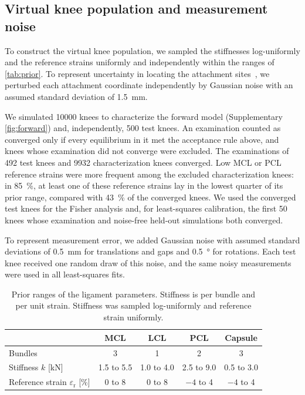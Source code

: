 \subsection{Virtual knee population and measurement noise}\label{sec:population}

To construct the virtual knee population, we sampled the stiffnesses log-uniformly and the reference strains uniformly and independently within the ranges of \autoref{tab:prior}.
To represent uncertainty in locating the attachment sites~\autocite{rachmat2014generating}, we perturbed each attachment coordinate independently by Gaussian noise with an assumed standard deviation of \SI{1.5}{\milli\meter}.

We simulated \num{10000} knees to characterize the forward model (Supplementary \autoref{fig:forward}) and, independently, 500 test knees.
An examination counted as converged only if every equilibrium in it met the acceptance rule above, and knees whose examination did not converge were excluded.
The examinations of 492 test knees and \num{9932} characterization knees converged.
Low MCL or PCL reference strains were more frequent among the excluded characterization knees: in \SI{85}{\percent}, at least one of these reference strains lay in the lowest quarter of its prior range, compared with \SI{43}{\percent} of the converged knees.
We used the converged test knees for the Fisher analysis and, for least-squares calibration, the first 50 knees whose examination and noise-free held-out simulations both converged.

To represent measurement error, we added Gaussian noise with assumed standard deviations of \SI{0.5}{\milli\meter} for translations and gaps and \SI{0.5}{\degree} for rotations.
Each test knee received one random draw of this noise, and the same noisy measurements were used in all least-squares fits.

\begin{table}[H]
\centering
\caption{Prior ranges of the ligament parameters.
Stiffness is per bundle and per unit strain.
Stiffness was sampled log-uniformly and reference strain uniformly.}
\label{tab:prior}
\begin{tabular}{lcccc}
\toprule
 & MCL & LCL & PCL & Capsule \\
\midrule
Bundles & 3 & 1 & 2 & 3\\
Stiffness $k$ [\si{\kilo\newton}] & 1.5 to 5.5 & 1.0 to 4.0 & 2.5 to 9.0 & 0.5 to 3.0\\
Reference strain $\varepsilon_\mathrm{r}$ [\si{\percent}] & 0 to 8 & 0 to 8 & $-4$ to 4 & $-4$ to 4\\
\bottomrule
\end{tabular}
\end{table}

